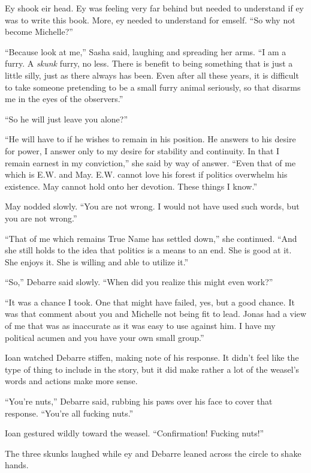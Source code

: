 Ey shook eir head. Ey was feeling very far behind but needed to understand if ey was to write this book. More, ey needed to understand for emself. ``So why not become Michelle?''

``Because look at me,'' Sasha said, laughing and spreading her arms. ``I am a furry. A \emph{skunk} furry, no less. There is benefit to being something that is just a little silly, just as there always has been. Even after all these years, it is difficult to take someone pretending to be a small furry animal seriously, so that disarms me in the eyes of the observers.''

``So he will just leave you alone?''

``He will have to if he wishes to remain in his position. He answers to his desire for power, I answer only to my desire for stability and continuity. In that I remain earnest in my conviction,'' she said by way of answer. ``Even that of me which is E.W. and May. E.W. cannot love his forest if politics overwhelm his existence. May cannot hold onto her devotion. These things I know.''

May nodded slowly. ``You are not wrong. I would not have used such words, but you are not wrong.''

``That of me which remains True Name has settled down,'' she continued. ``And she still holds to the idea that politics is a means to an end. She is good at it. She enjoys it. She is willing and able to utilize it.''

``So,'' Debarre said slowly. ``When did you realize this might even work?''

``It was a chance I took. One that might have failed, yes, but a good chance. It was that comment about you and Michelle not being fit to lead. Jonas had a view of me that was as inaccurate as it was easy to use against him. I have my political acumen and you have your own small group.''

Ioan watched Debarre stiffen, making note of his response. It didn't feel like the type of thing to include in the story, but it did make rather a lot of the weasel's words and actions make more sense.

``You're nuts,'' Debarre said, rubbing his paws over his face to cover that response. ``You're all fucking nuts.''

Ioan gestured wildly toward the weasel. ``Confirmation! Fucking nuts!''

The three skunks laughed while ey and Debarre leaned across the circle to shake hands.
